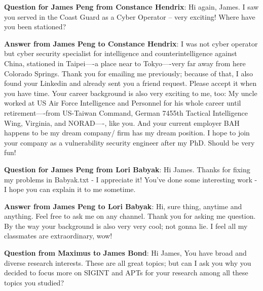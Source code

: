 \textbf{Question for James Peng from Constance Hendrix}:  Hi again, James.  I saw you served in the Coast Guard as a Cyber Operator -- very exciting!  Where have you been stationed?

\textbf{Answer from James Peng to Constance Hendrix}:  I was not cyber operator but cyber security specialist for intelligence and counterintelligence against China, stationed in Taipei----a place near to Tokyo----very far away from here Colorado Springs. Thank you for emailing me previously; because of that, I also found your Linkedin and already sent you a friend request. Please accept it when you have time. Your career background is also very exciting to me, too: My uncle worked at US Air Force Intelligence and Personnel for his whole career until retirement----from US-Taiwan Command, German 7455th Tactical Intelligence Wing, Virginia, and NORAD----, like you. And your current employer BAH happens to be my dream company/ firm has my dream position. I hope to join your company as a vulnerability security engineer after my PhD. Should be very fun!   

\textbf{Question for James Peng from Lori Babyak}:  Hi James. Thanks for fixing my problems in Babyak.txt - I appreciate it!  You've done some interesting work - I hope you can explain it to me sometime.

\textbf{Answer from James Peng to Lori Babyak}:  Hi, sure thing, anytime and anything. Feel free to ask me on any channel. Thank you for asking me question. By the way your background is also very very cool; not gonna lie. I feel all my classmates are extraordinary, wow!

\textbf{Question from Maximus to James Bond}: Hi James, You have broad and diverse research interests. These are all great topics; but can I ask you why you decided to focus more on SIGINT and APTs for your research among all these topics you studied? 